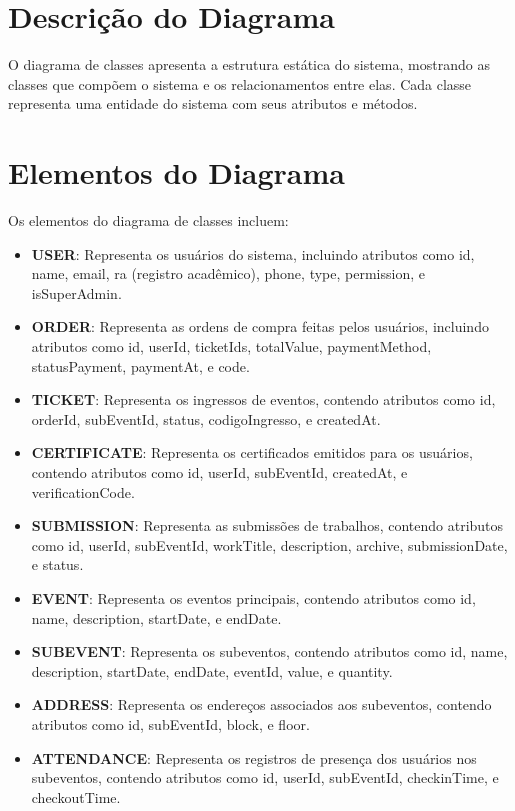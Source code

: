 \begin{itemize}
\begin{description}
\section{Descrição do Diagrama}

O diagrama de classes apresenta a estrutura estática do sistema, mostrando as classes que compõem o sistema e os relacionamentos entre elas. Cada classe representa uma entidade do sistema com seus atributos e métodos.

\section{Elementos do Diagrama}

Os elementos do diagrama de classes incluem:

\begin{itemize}
    \item \textbf{USER}: Representa os usuários do sistema, incluindo atributos como id, name, email, ra (registro acadêmico), phone, type, permission, e isSuperAdmin.
    \item \textbf{ORDER}: Representa as ordens de compra feitas pelos usuários, incluindo atributos como id, userId, ticketIds, totalValue, paymentMethod, statusPayment, paymentAt, e code.
    \item \textbf{TICKET}: Representa os ingressos de eventos, contendo atributos como id, orderId, subEventId, status, codigoIngresso, e createdAt.
    \item \textbf{CERTIFICATE}: Representa os certificados emitidos para os usuários, contendo atributos como id, userId, subEventId, createdAt, e verificationCode.
    \item \textbf{SUBMISSION}: Representa as submissões de trabalhos, contendo atributos como id, userId, subEventId, workTitle, description, archive, submissionDate, e status.
    \item \textbf{EVENT}: Representa os eventos principais, contendo atributos como id, name, description, startDate, e endDate.
    \item \textbf{SUBEVENT}: Representa os subeventos, contendo atributos como id, name, description, startDate, endDate, eventId, value, e quantity.
    \item \textbf{ADDRESS}: Representa os endereços associados aos subeventos, contendo atributos como id, subEventId, block, e floor.
    \item \textbf{ATTENDANCE}: Representa os registros de presença dos usuários nos subeventos, contendo atributos como id, userId, subEventId, checkinTime, e checkoutTime.
\end{itemize}


\end{description}
\end{itemize}
